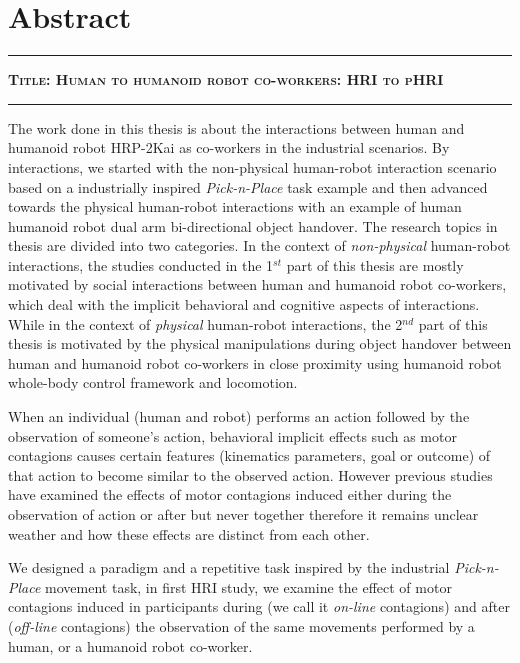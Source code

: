 {\color{blue}\chapter*{Abstract}}
\thispagestyle{empty}

\noindent \hrule\vspace{3pt}
\par\nobreak
\noindent\textbf{\textsc{Title: Human to humanoid robot co-workers: HRI to pHRI}}
\noindent \vspace{3pt}\hrule\vspace{3pt}


The work done in this thesis is about the interactions between human and humanoid robot HRP-2Kai as co-workers in the industrial scenarios. By interactions, we started with the non-physical human-robot interaction scenario based on a industrially inspired \textit{Pick-n-Place} task example and then advanced towards the physical human-robot interactions with an example of human humanoid robot dual arm bi-directional object handover. The research topics in thesis are divided into two categories. In the context of \textit{non-physical} human-robot interactions, the studies conducted in the 1$^{st}$ part of this thesis are mostly motivated by social interactions between human and humanoid robot co-workers, which deal with the implicit behavioral and cognitive aspects of interactions. While in the context of \textit{physical} human-robot interactions, the 2$^{nd}$ part of this thesis is motivated by the physical manipulations during object handover between human and humanoid robot co-workers in close proximity using humanoid robot whole-body control framework and locomotion.


When an individual (human and robot) performs an action followed by the observation of someone's action, behavioral implicit effects such as motor contagions causes certain features (kinematics parameters, goal or outcome) of that action to become similar to the observed action. However previous studies have examined the effects of motor contagions induced either during the observation of action or after but never together therefore it remains unclear weather and how these effects are distinct from each other.

We designed a paradigm and a repetitive task inspired by the industrial \textit{Pick-n-Place} movement task, in first HRI study, we examine the effect of motor contagions induced in participants during (we call it \textit{on-line} contagions) and after (\textit{off-line} contagions) the observation of the same movements performed by a human, or a humanoid robot co-worker.

